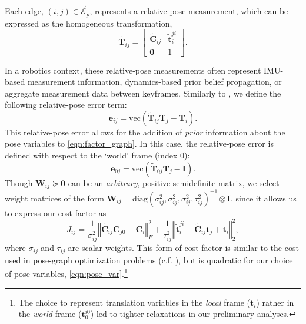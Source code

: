 \documentclass[lettersize,journal]{IEEEtran}
\newcommand{\EdgeSet}{\vec{\bm{\mathcal{E}}}}
\newcommand{\vect}[1]{\mbox{vec}(#1)}
\newcommand{\diag}[1]{\mbox{diag}\left(#1\right)}
\begin{document}
Each edge, $(i,j) \in \EdgeSet_p $, represents a relative-pose measurement, which can be expressed as the homogeneous transformation,
\begin{equation}
	\tilde{\bm{T}}_{ij} = \begin{bmatrix}
		\tilde{\bm{C}}_{ij} & \tilde{\bm{t}}_i^{ji} \\ \bm{0} & 1
	\end{bmatrix}.
\end{equation}

In a robotics context, these relative-pose measurements often represent IMU-based measurement information, dynamics-based prior belief propagation, or aggregate measurement data between keyframes. Similarly to \cite{brialesCartanSyncFastGlobal2017}, we define the following relative-pose error term:
\begin{equation}\label{eqn:rel_pose_err}
	\bm{e}_{ij} = \vect{\tilde{\bm{T}}_{ij}\bm{T}_j - \bm{T}_i}.
\end{equation}
This relative-pose error allows for the addition of \emph{prior} information about the pose variables to \eqref{eqn:factor_graph}. In this case, the relative-pose error is defined with respect to the `world' frame (index $0$):
\begin{equation}\label{eqn:prior_pose_err}
	\bm{e}_{0j} = \vect{\tilde{\bm{T}}_{0j}\bm{T}_j - \bm{I}}.
\end{equation}
Though $\bm{W}_{ij} \succeq \bm{0} $ can be an \emph{arbitrary}, positive semidefinite matrix, we select weight matrices of the form $\bm{W}_{ij}=\diag{\sigma^2_{ij},\sigma^2_{ij},\sigma^2_{ij},\tau^2_{ij}}^{-1} \otimes \bm{I}$, since it allows us to express our cost factor as
\begin{equation}\label{eqn:rel_pose_cost}
	J_{ij} = \frac{1}{\sigma^2_{ij}} \left\Vert \tilde{\bm{C}}_{ij}\bm{C}_{j0} - \bm{C}_i\right\Vert_F^2 + \frac{1}{\tau^2_{ij}} \left\Vert \tilde{\bm{t}}^{ji}_{i} - \tilde{\bm{C}}_{ij}\bm{t}_j + \bm{t}_i \right\Vert_2^2,
\end{equation}
where $\sigma_{ij}$ and $\tau_{ij}$ are scalar weights. This form of cost factor is similar to the cost used in pose-graph optimization problems (c.f. \cite{brialesCartanSyncFastGlobal2017, rosenSESyncCertifiablyCorrect2019, holmesEfficientGlobalOptimality2023}), but is quadratic for our choice of pose variables, \eqref{eqn:pose_var}.\footnote{The choice to represent translation variables in the \emph{local} frame ($\bm{t}_i$) rather in the \emph{world} frame ($\bm{t}_0^{i0}$) led to tighter relaxations in our preliminary analyses.}
\end{document}
